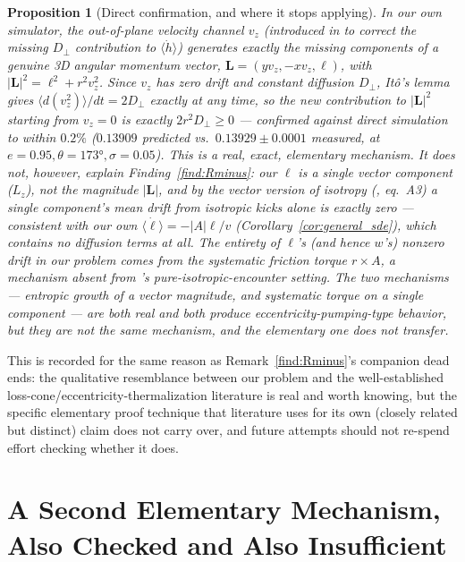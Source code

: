 \documentclass[12pt]{amsart}
\theoremstyle{plain}
\newtheorem{proposition}[theorem]{Proposition}
\theoremstyle{remark}
\begin{document}
\begin{proposition}[Direct confirmation, and where it stops applying]\label{prop:HMcheck}
In our own simulator, the out-of-plane velocity channel $v_z$ (introduced in \cite{Ebert2026MonteCarloNote} to correct the missing $D_\perp$ contribution to $\langle\dot h\rangle$) generates exactly the missing components of a genuine 3D angular momentum vector, $\mathbf{L}=(yv_z,-xv_z,\ell)$, with $|\mathbf{L}|^2=\ell^2+r^2v_z^2$. Since $v_z$ has zero drift and constant diffusion $D_\perp$, It\^o's lemma gives $\langle d(v_z^2)\rangle/dt=2D_\perp$ exactly at any time, so the new contribution to $|\mathbf{L}|^2$ starting from $v_z=0$ is exactly $2r^2D_\perp\geq0$ --- confirmed against direct simulation to within $0.2\%$ ($0.13909$ predicted vs.\ $0.13929\pm0.0001$ measured, at $e=0.95,\theta=173°,\sigma=0.05$). This is a real, exact, elementary mechanism. It does not, however, explain Finding~\ref{find:Rminus}: our $\ell$ is a single vector component ($L_z$), not the magnitude $|\mathbf{L}|$, and by the vector version of isotropy (\cite{HamiltonModak2024}, eq.~A3) a single component's mean drift from isotropic kicks alone is exactly zero --- consistent with our own $\langle\dot\ell\rangle=-|A|\ell/v$ (Corollary~\ref{cor:general_sde}), which contains no diffusion terms at all. The entirety of $\ell$'s (and hence $w$'s) nonzero drift in our problem comes from the systematic friction torque $r\times A$, a mechanism absent from \cite{HamiltonModak2024}'s pure-isotropic-encounter setting. The two mechanisms --- entropic growth of a vector magnitude, and systematic torque on a single component --- are both real and both produce eccentricity-pumping-type behavior, but they are not the same mechanism, and the elementary one does not transfer.
\end{proposition}

This is recorded for the same reason as Remark~\ref{find:Rminus}'s companion dead ends: the qualitative resemblance between our problem and the well-established loss-cone/eccentricity-thermalization literature is real and worth knowing, but the specific elementary proof technique that literature uses for its own (closely related but distinct) claim does not carry over, and future attempts should not re-spend effort checking whether it does.

\section{A Second Elementary Mechanism, Also Checked and Also Insufficient}
\end{document}
